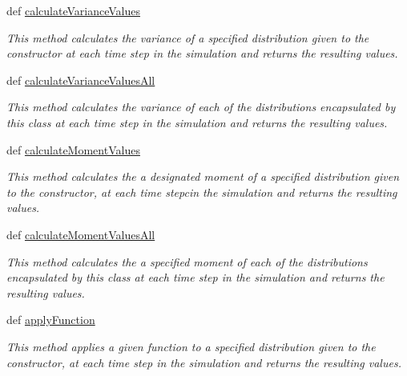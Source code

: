 \begin{DoxyCompactItemize}
def \hyperlink{class_distribution_data_processor_1_1_distribution_data_processor_ab78b6628c9a09675d84a79f2a85ab62f}{calculateVarianceValues}
\begin{DoxyCompactList}\small\item\em This method calculates the variance of a specified distribution given to the constructor at each time step in the simulation and returns the resulting values. \item\end{DoxyCompactList}\item 
def \hyperlink{class_distribution_data_processor_1_1_distribution_data_processor_a8af920362a59782691c4710dcce1b83b}{calculateVarianceValuesAll}
\begin{DoxyCompactList}\small\item\em This method calculates the variance of each of the distributions encapsulated by this class at each time step in the simulation and returns the resulting values. \item\end{DoxyCompactList}\item 
def \hyperlink{class_distribution_data_processor_1_1_distribution_data_processor_a2bf48881db0e55f1c5867e41f76a27f9}{calculateMomentValues}
\begin{DoxyCompactList}\small\item\em This method calculates the a designated moment of a specified distribution given to the constructor, at each time stepcin the simulation and returns the resulting values. \item\end{DoxyCompactList}\item 
def \hyperlink{class_distribution_data_processor_1_1_distribution_data_processor_aaac7f2b110c8966483eb7e424d76d2c4}{calculateMomentValuesAll}
\begin{DoxyCompactList}\small\item\em This method calculates the a specified moment of each of the distributions encapsulated by this class at each time step in the simulation and returns the resulting values. \item\end{DoxyCompactList}\item 
def \hyperlink{class_distribution_data_processor_1_1_distribution_data_processor_ac5295ab18bec24e9da03dad11bd45352}{applyFunction}
\begin{DoxyCompactList}\small\item\em This method applies a given function to a specified distribution given to the constructor, at each time step in the simulation and returns the resulting values. \item\end{DoxyCompactList}\item 

\end{DoxyCompactItemize}
